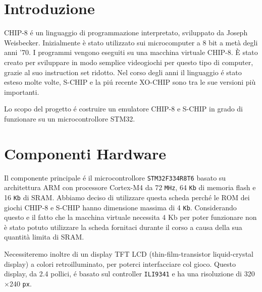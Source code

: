 \documentclass[a4paper]{article}
\begin{document}
\setlength{\parindent}{0pt}
\setlength{\parskip}{0.8em}
\linespread{1.5}

\section{Introduzione}

CHIP-8 é un linguaggio di programmazione interpretato, sviluppato da Joseph Weisbecker. Inizialmente è stato utilizzato sui microcomputer a 8 bit a metà degli anni '70. I programmi vengono eseguiti su una macchina virtuale CHIP-8. È stato creato per sviluppare in modo semplice videogiochi per questo tipo di computer, grazie al suo instruction set ridotto. Nel corso degli anni il linguaggio é stato esteso molte volte, S-CHIP e la piú recente XO-CHIP sono tra le sue versioni più importanti.

Lo scopo del progetto é costruire un emulatore CHIP-8 e S-CHIP in grado di funzionare su un microcontrollore STM32.


\section{Componenti Hardware}



Il componente principale é il microcontrollore \texttt{STM32F334R8T6} basato su architettura ARM con processore Cortex-M4 da 72 \texttt{MHz}, 64 \texttt{Kb} di memoria flash e 16 \texttt{Kb} di SRAM. Abbiamo deciso di utilizzare questa scheda perché le ROM dei giochi CHIP-8 e S-CHIP hanno dimensione massima di 4 \texttt{Kb}. Considerando questo e il fatto che la macchina virtuale necessita 4 Kb per poter funzionare non è stato potuto utilizzare la scheda fornitaci durante il corso a causa della sua quantità limita di SRAM.

Necessiteremo inoltre di un display TFT LCD (thin-film-transistor liquid-crystal display) a colori retroilluminato, per poterci interfacciare col gioco. Questo display, da 2.4 pollici, é basato sul controller \texttt{ILI9341} e ha una risoluzione di 320$\times$240 \texttt{px}.
\end{document}
